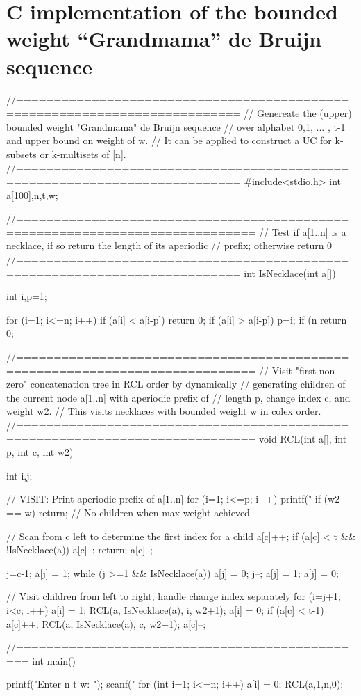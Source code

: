 \documentclass[US-letter,USenglish,authorcolumns,autoref]{lipics-v2021}
\begin{document}


\normalsize
\appendix

\newpage
\section{C implementation of the bounded weight ``Grandmama'' de Bruijn sequence}

\footnotesize

\begin{code}
//===========================================================================
// Genereate the (upper) bounded weight "Grandmama" de Bruijn sequence 
// over alphabet {0,1, ... , t-1} and upper bound on weight of w.
// It can be applied to construct a UC for k-subsets or k-multisets of [n].
//===========================================================================
#include<stdio.h>
int a[100],n,t,w;

//=============================================================================
// Test if a[1..n] is a necklace, if so return the length of its aperiodic
// prefix; otherwise return 0
//===========================================================================
int IsNecklace(int a[]) {
    int i,p=1;
    
    for (i=1; i<=n; i++) {
        if (a[i] < a[i-p]) return 0;
        if (a[i] > a[i-p]) p=i;
    }
    if (n%
    return 0;
}
//=============================================================================
// Visit "first non-zero" concatenation tree in RCL order by dynamically
// generating children of the current node a[1..n] with aperiodic prefix of
// length p, change index c, and weight w2.
// This visits necklaces with bounded weight w in colex order.
//=============================================================================
void RCL(int a[], int p, int c, int w2) {
    int i,j;
    
    // VISIT: Print aperiodic prefix of a[1..n]
    for (i=1; i<=p; i++) printf("%
    if (w2 == w) return;    // No children when max weight achieved
    
    // Scan from c left to determine the first index for a child
    a[c]++;
    if (a[c] < t && !IsNecklace(a))  { a[c]--; return; }
    a[c]--;
    
    j=c-1;
    a[j] = 1;
    while (j >=1 && IsNecklace(a)) {
        a[j] = 0; j--; a[j] = 1;
    }
    a[j] = 0;
    
    // Visit children from left to right, handle change index separately
    for (i=j+1; i<c; i++) {
        a[i] = 1;
        RCL(a, IsNecklace(a), i, w2+1);
        a[i] = 0;
    }
    if (a[c] < t-1) {
        a[c]++;
        RCL(a, IsNecklace(a), c, w2+1);
        a[c]--;
    }
}
//===============================================
int main() {
    
    printf("Enter n t w: ");  scanf("%
    for (int i=1; i<=n; i++) a[i] = 0;
    RCL(a,1,n,0);
}
    
\end{code}
\end{document}
